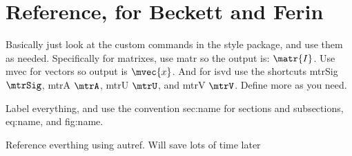 \section{Reference, for Beckett and Ferin}
Basically just look at the custom commands in the style package, and use them as needed. 
Specifically for matrixes, use matr so the output is: $\matr{I}$. Use mvec for vectors
so output is $\mvec{x}$. And for isvd use the shortcuts mtrSig $\mtrSig$, mtrA $\mtrA$, mtrU $\mtrU$, and mtrV $\mtrV$.
Define more as you need.

Label everything, and use the convention sec:name for sections and subsections, eq:name, and fig:name.

Reference everthing using autref. Will save lots of time later

